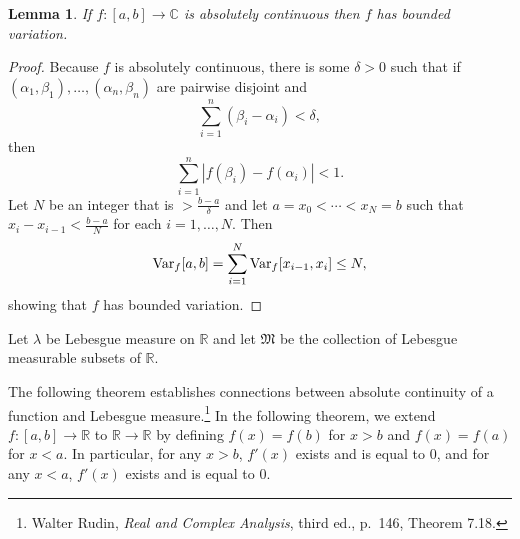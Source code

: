 \documentclass{article}
\newcommand{\Var}{\ensuremath\mathrm{Var}}
\newtheorem{lemma}[theorem]{Lemma}
\theoremstyle{definition}
\begin{document}
\begin{lemma}
If $f:[a,b] \to \mathbb{C}$ is absolutely continuous then $f$ has bounded variation.
\label{BV}
\end{lemma}
\begin{proof}
Because $f$ is absolutely continuous, there is some $\delta>0$ such that if $(\alpha_1,\beta_1),\ldots,(\alpha_n,\beta_n)$
are pairwise disjoint and
\[
\sum_{i=1}^n (\beta_i-\alpha_i) < \delta,
\]
then
\[
\sum_{i=1}^n |f(\beta_i)-f(\alpha_i)|<1.
\]
Let $N$ be an integer that is $>\frac{b-a}{\delta}$ and let
$a=x_0<\cdots<x_N=b$ such that
$x_i-x_{i-1}<\frac{b-a}{N}$ for each $i=1,\ldots,N$. Then
\[
\Var_f[a,b] = \sum_{i=1}^N \Var_f[x_{i-1},x_i]
\leq N,
\]
showing that $f$ has bounded variation.
\end{proof}

Let $\lambda$ be Lebesgue measure on $\mathbb{R}$ and let $\mathfrak{M}$ be the collection of Lebesgue measurable
subsets of $\mathbb{R}$. 

The following theorem establishes connections between absolute continuity of a function and Lebesgue measure.\footnote{Walter
Rudin, {\em Real and Complex Analysis}, third ed., p.~146, Theorem 7.18.} In the following theorem, we extend $f:[a,b] \to \mathbb{R}$
to $\mathbb{R} \to \mathbb{R}$ by defining $f(x)=f(b)$ for $x>b$ and $f(x)=f(a)$ for $x<a$. In particular, for any $x>b$,
$f'(x)$ exists and is equal to $0$, and for any $x<a$, $f'(x)$ exists and is equal to $0$.
\end{document}
